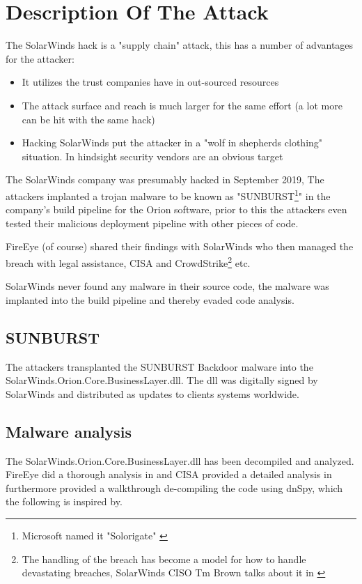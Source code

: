 \documentclass[
	letterpaper, %
	10pt, %
	unnumberedsections, %
	twoside, %
]{LTJournalArticle}
\begin{document}
\section{Description Of The Attack} 
The SolarWinds hack is a "supply chain" attack, this has a number of advantages for the attacker:

\begin{itemize}
	\item It utilizes the trust companies have in out-sourced resources 
	\item The attack surface and reach is much larger for the same effort (a lot more can be hit with the same hack)
	\item Hacking SolarWinds put the attacker in a "wolf in shepherds clothing" situation. In hindsight security vendors are an obvious target
\end{itemize} 

The SolarWinds company was presumably hacked in September 2019\cite{TechTargetSolarwinds}, The attackers implanted a trojan malware to be known as "SUNBURST\footnote{Microsoft named it "Solorigate" \cite{MicrosoftSolarwinds}}" in the company's build pipeline for the Orion software, prior to this the attackers even tested their malicious deployment pipeline with other pieces of code\cite{orangematterSunburst}. 
\par
FireEye (of course) shared their findings with SolarWinds who then managed the breach with legal assistance, CISA and CrowdStrike\footnote{The handling of the breach has become a model for how to handle devastating breaches, SolarWinds CISO Tm Brown talks about it in \cite{CISA_sunburst}} etc.   

SolarWinds never found any malware in their source code, the malware was implanted into the build pipeline and thereby evaded code analysis. 

\subsection{SUNBURST}
The attackers transplanted the SUNBURST Backdoor malware into the SolarWinds.Orion.Core.BusinessLayer.dll\cite{Mandiant}. The dll was digitally signed by SolarWinds and distributed as updates to clients systems worldwide.

\subsection{Malware analysis}     
The SolarWinds.Orion.Core.BusinessLayer.dll has been decompiled and analyzed\cite{SolarWindsOrionCoreBusinessLayerdll}. FireEye did a thorough analysis in\cite{Mandiant} and CISA provided a detailed analysis in \cite{CISA_sunburst} furthermore \cite{cybercdh} provided a walkthrough de-compiling the code using dnSpy, which the following is inspired by.
\end{document}
